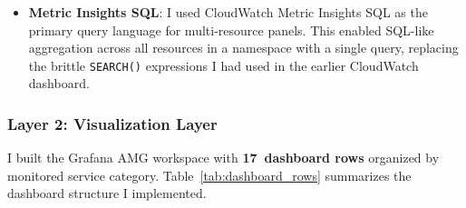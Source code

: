 \begin{itemize}
    \item \textbf{Metric Insights SQL}: I used CloudWatch Metric Insights SQL
          as the primary query language for
          multi-resource panels. This enabled
          SQL-like aggregation across all resources in a namespace with
          a single query, replacing the brittle \texttt{SEARCH()} expressions
          I had used in the earlier CloudWatch dashboard.
\end{itemize}

\subsubsection{Layer 2: Visualization Layer}

I built the Grafana AMG workspace with \textbf{17~dashboard rows} organized by
monitored service category. Table~\ref{tab:dashboard_rows} summarizes the
dashboard structure I implemented.

